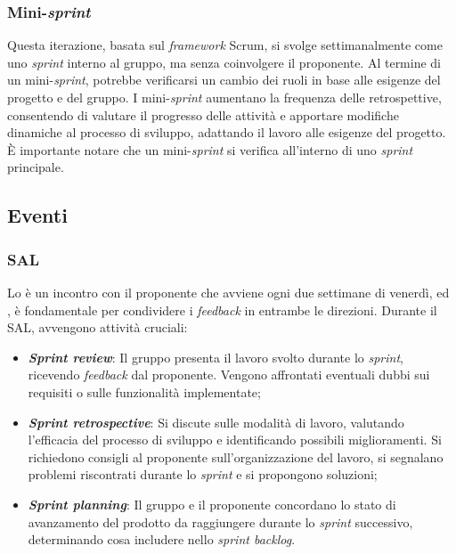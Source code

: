 \subsubsection{Mini-\textit{sprint}}
Questa iterazione, basata sul \textit{framework} Scrum, si svolge settimanalmente 
come uno \textit{sprint} interno al gruppo, ma senza coinvolgere il proponente. 
Al termine di un mini-\textit{sprint}, potrebbe verificarsi un cambio dei ruoli 
in base alle esigenze del progetto e del gruppo. 
I mini-\textit{sprint} aumentano la frequenza delle retrospettive, consentendo 
di valutare il progresso delle attività e apportare modifiche dinamiche al processo 
di sviluppo, adattando il lavoro alle esigenze del progetto. 
È importante notare che un mini-\textit{sprint} si verifica all'interno di uno 
\textit{sprint} principale.

\subsection{Eventi}

\subsubsection{SAL\g}
Lo \SAL{} è un incontro con il proponente che
avviene ogni due settimane di venerdì, ed , è fondamentale per condividere i 
\textit{feedback} in entrambe le direzioni. 
Durante il SAL, avvengono attività cruciali:

\begin{itemize}
	\item \textbf{\textit{Sprint review}}: Il gruppo presenta il lavoro svolto 
			durante lo \textit{sprint}, ricevendo \textit{feedback} dal proponente. 
			Vengono affrontati eventuali dubbi sui requisiti o sulle funzionalità implementate;
	
	\item \textbf{\textit{Sprint retrospective}}: Si discute sulle modalità di lavoro, 
			valutando l'efficacia del processo di sviluppo e identificando possibili miglioramenti. 
			Si richiedono consigli al proponente sull'organizzazione del lavoro, si segnalano 
			problemi riscontrati durante lo \textit{sprint} e si propongono soluzioni;

	\item \textbf{\textit{Sprint planning}}: Il gruppo e il proponente concordano lo stato 
			di avanzamento del prodotto da raggiungere durante lo \textit{sprint} successivo, 
			determinando cosa includere nello \textit{sprint backlog}.
\end{itemize}

